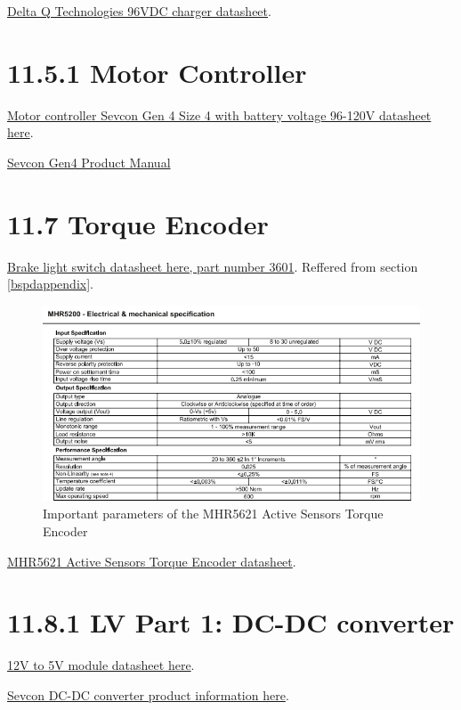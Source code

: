 \documentclass{article}
\begin{document}
\href{http://delta-q.com/wp-content/uploads/2015/12/Delta-Q_QuiQ1000_BatteryCharger_Specifications.pdf}{Delta Q Technologies 96VDC charger datasheet}.

\section*{11.5.1 Motor Controller}

\href{http://www.sevcon.com/media/2461/Gen4\%20Aug\%202013\%20web.pdf}{Motor controller Sevcon Gen 4 Size 4 with battery voltage 96-120V datasheet here}.

\href{http://www.thunderstruck-ev.com/Manuals/Gen4_Product_Manual_V3.0.pdf}{Sevcon Gen4 Product Manual}

\section*{11.7 Torque Encoder} \label{torqueappendix}

\href{https://www.pegasusautoracing.com/2015/086.pdf}{Brake light switch datasheet here, part number 3601}. Reffered from section \ref{bspdappendix}.

\begin{figure}[H]
    \centering
    \includegraphics[width = 0.6 \textwidth]{activesensorsnip}
    \caption{Important parameters of the MHR5621 Active Sensors Torque Encoder}
    \label{torquesnip}
\end{figure}

\href{http://www.magni-tec.com/datasheet/WS-MHR5200.pdf}{MHR5621 Active Sensors Torque Encoder datasheet}.

\section*{11.8.1 LV Part 1: DC-DC converter}

\href{https://www.superbrightleds.com/moreinfo/bar-strip-accessories/12vdc-to-5vdc-voltage-converter-/1549/3652/#/tab/Specifications}{12V to 5V module datasheet here}.

\href{http://www.evdrives.com/product_p/vr-sevcon-7213.htm}{Sevcon DC-DC converter product information here}.
\end{document}
